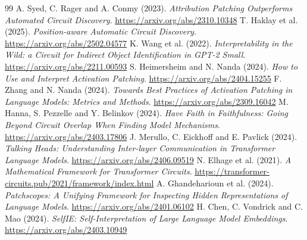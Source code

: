 \documentclass[11pt,a4paper]{article}
\begin{document}
\begin{thebibliography}{99}
 A. Syed, C. Rager and A. Conmy (2023).
\emph{Attribution Patching Outperforms Automated Circuit Discovery}.
\url{https://arxiv.org/abs/2310.10348}
 T. Haklay et al. (2025).
\emph{Position-aware Automatic Circuit Discovery}.
\url{https://arxiv.org/abs/2502.04577}
 K. Wang et al. (2022).
\emph{Interpretability in the Wild: a Circuit for Indirect Object Identification in GPT-2 Small}.
\url{https://arxiv.org/abs/2211.00593}
 S. Heimersheim and N. Nanda (2024).
\emph{How to Use and Interpret Activation Patching}.
\url{https://arxiv.org/abs/2404.15255}
 F. Zhang and N. Nanda (2024).
\emph{Towards Best Practices of Activation Patching in Language Models: Metrics and Methods}.
\url{https://arxiv.org/abs/2309.16042}
 M. Hanna, S. Pezzelle and Y. Belinkov (2024).
\emph{Have Faith in Faithfulness: Going Beyond Circuit Overlap When Finding Model Mechanisms}.
\url{https://arxiv.org/abs/2403.17806}
 J. Merullo, C. Eickhoff and E. Pavlick (2024).
\emph{Talking Heads: Understanding Inter-layer Communication in Transformer Language Models}.
\url{https://arxiv.org/abs/2406.09519}
 N. Elhage et al. (2021).
\emph{A Mathematical Framework for Transformer Circuits}.
\url{https://transformer-circuits.pub/2021/framework/index.html}
 A. Ghandeharioun et al. (2024).
\emph{Patchscopes: A Unifying Framework for Inspecting Hidden Representations of Language Models}.
\url{https://arxiv.org/abs/2401.06102}
 H. Chen, C. Vondrick and C. Mao (2024).
\emph{SelfIE: Self-Interpretation of Large Language Model Embeddings}.
\url{https://arxiv.org/abs/2403.10949}
\end{thebibliography}
\end{document}
